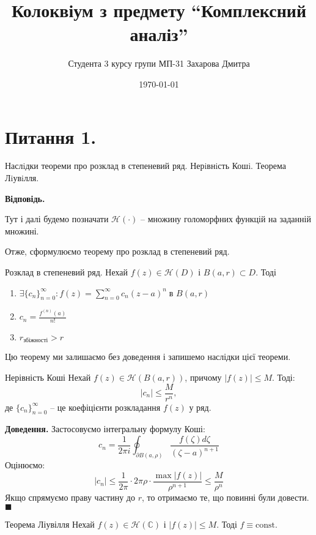 \documentclass[14pt]{extarticle}
\title{Колоквіум з предмету ``Комплексний аналіз''}
\author{Студента 3 курсу групи МП-31 Захарова Дмитра}
\date{\today}
\begin{document}
\maketitle

\section*{Питання 1.}

Наслiдки теореми про розклад в степеневий ряд. Нерiвнiсть Кошi. Теорема Лiувiлля.

\textbf{Відповідь.}

Тут і далі будемо позначати $\mathcal{H}(\cdot)$ -- множину голоморфних функцій на заданній множині.

Отже, сформулюємо теорему про розклад в степеневий ряд.

\begin{theorem*}{Розклад в степеневий ряд.}
    Нехай $f(z) \in \mathcal{H}(D)$ і $B(a,r) \subset D$. Тоді
\begin{enumerate}
\item $
\exists \{c_n\}_{n=0}^{\infty}: f(z) = \sum_{n=0}^{\infty} c_n(z-a)^n \; \text{в $B(a,r)$}
$
\item $c_n = \frac{f^{(n)}(a)}{n!}$
\item $r_{\text{збіжності}} > r$
\end{enumerate}
\end{theorem*}

Цю теорему ми залишаємо без доведення і запишемо наслідки цієї теореми. 

\begin{theorem*}{Нерівність Коші}
Нехай $f(z) \in \mathcal{H}(B(a,r))$, причому $|f(z)| \leq M$. Тоді:
\[
|c_n| \leq \frac{M}{r^n},
\]    
де $\{c_n\}_{n=0}^{\infty}$ -- це коефіцієнти розкладання $f(z)$ у ряд.
\end{theorem*}

\textbf{Доведення.} Застосовуємо інтегральну формулу Коші:
\[
c_n = \frac{1}{2\pi i}\oint_{\partial B(a,\rho)} \frac{f(\zeta)d\zeta}{(\zeta-a)^{n+1}}
\]
Оцінюємо:
\[
|c_n| \leq \frac{1}{2\pi} \cdot 2\pi \rho \cdot \frac{\max|f(z)|}{\rho^{n+1}} \leq \frac{M}{\rho^n}
\]
Якщо спрямуємо праву частину до $r$, то отримаємо те, що повинні були довести. $\blacksquare$

\begin{theorem*}{Теорема Ліувілля}
    Нехай $f(z) \in \mathcal{H}(\mathbb{C})$ і $|f(z)| \leq M$. Тоді $f \equiv \text{const}$.
\end{theorem*}
\end{document}
